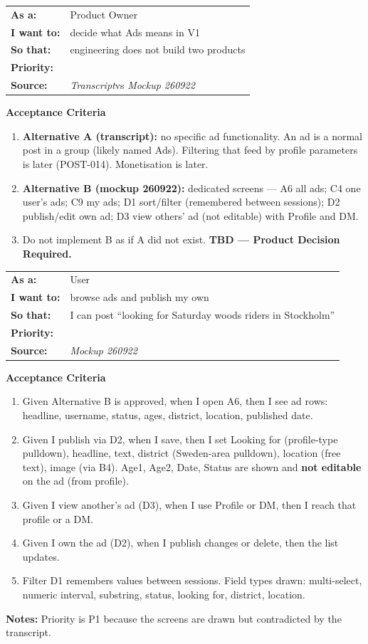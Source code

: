 \documentclass[11pt,a4paper]{article}
\makeatletter
\newcommand{\priPone}{\colorbox{p1}{\makebox[4.6em]{\textcolor{white}{\scriptsize\bfseries P1}}}}
\newcommand{\priTBD}{\colorbox{tbd}{\makebox[4.6em]{\textcolor{white}{\scriptsize\bfseries TBD}}}}
\newcommand{\srcTx}{\textit{Transcript}}
\newcommand{\srcMock}{\textit{Mockup 260922}}
\newenvironment{story}[1]{%
  \Needspace{10\baselineskip}%
  \vspace{0.7em}%
  \noindent
  \colorbox{navy}{\makebox[\dimexpr\textwidth-2\fboxsep\relax][l]{\textcolor{white}{\bfseries\ #1}}}%
  \par\vspace{0.35em}%
}{\par\vspace{0.55em}}
\newcommand{\storymeta}[5]{%
  \noindent
  \begin{tabularx}{\textwidth}{@{}>{\bfseries}l X@{}}
    As a: & #1 \\
    I want to: & #2 \\
    So that: & #3 \\
    Priority: & #4 \\
    Source: & #5 \\
  \end{tabularx}
  \par\vspace{0.3em}
}
\newcommand{\achead}{\noindent\textbf{Acceptance Criteria}\par}
\newcommand{\notes}[1]{\noindent\textbf{Notes:} #1\par}
\makeatother
\begin{document}
\begin{story}{AD-001 --- V1 ads concept (conflict)}
\storymeta{Product Owner}{decide what Ads means in V1}{engineering does not build two products}{\priTBD}{\srcTx vs \srcMock}
\achead
\begin{enumerate}
  \item \textbf{Alternative A (transcript):} no specific ad functionality. An ad is a normal post in a group (likely named Ads). Filtering that feed by profile parameters is later (POST-014). Monetisation is later.
  \item \textbf{Alternative B (mockup 260922):} dedicated screens --- A6 all ads; C4 one user's ads; C9 my ads; D1 sort/filter (remembered between sessions); D2 publish/edit own ad; D3 view others' ad (not editable) with Profile and DM.
  \item Do not implement B as if A did not exist. \textbf{TBD --- Product Decision Required.}
\end{enumerate}
\end{story}

\begin{story}{AD-002 --- Dedicated ad list and publish (only if Alternative B is chosen)}
\storymeta{User}{browse ads and publish my own}{I can post ``looking for Saturday woods riders in Stockholm''}{\priPone}{\srcMock}
\achead
\begin{enumerate}
  \item Given Alternative B is approved, when I open A6, then I see ad rows: headline, username, status, ages, district, location, published date.
  \item Given I publish via D2, when I save, then I set Looking for (profile-type pulldown), headline, text, district (Sweden-area pulldown), location (free text), image (via B4). Age1, Age2, Date, Status are shown and \textbf{not editable} on the ad (from profile).
  \item Given I view another's ad (D3), when I use Profile or DM, then I reach that profile or a DM.
  \item Given I own the ad (D2), when I publish changes or delete, then the list updates.
  \item Filter D1 remembers values between sessions. Field types drawn: multi-select, numeric interval, substring, status, looking for, district, location.
\end{enumerate}
\notes{Priority is P1 because the screens are drawn but contradicted by the transcript.}
\end{story}
\end{document}
